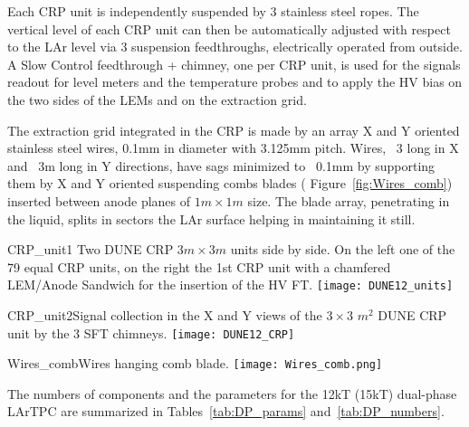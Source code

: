 Each CRP unit is independently suspended  by 3 stainless steel ropes. The  vertical level of each CRP unit can then be automatically adjusted with respect to the LAr level via 3 suspension feedthroughs, electrically operated from outside. A Slow Control feedthrough + chimney, one per CRP unit, is used for the signals readout for level meters and the temperature probes and to apply the HV bias on the two sides of the LEMs  and on the extraction grid.

The extraction grid integrated in the CRP  is made by an array X and Y oriented stainless steel wires, 0.1mm in diameter with 3.125mm pitch.  Wires, ~3 long in X and ~3m long in Y directions, have sags minimized to ~0.1mm by supporting them by X and Y oriented suspending combs blades ( Figure~\ref{fig:Wires_comb}) inserted between anode planes of $1m \times 1m$ size. The blade array, penetrating in the liquid, splits in sectors the LAr surface helping in maintaining it still.

\begin{cdrfigure}{CRP_unit1}{ Two DUNE CRP $3m\times 3m$ units side by side. On the left one of the 79 equal CRP units, on the right the 1st CRP unit with a chamfered LEM/Anode Sandwich for the insertion of the HV FT.}
\texttt{[image: DUNE12\_units]}
\end{cdrfigure}

\begin{cdrfigure}{CRP_unit2}{Signal collection in the X and Y views of the  $3\times3$ $m^2$ DUNE CRP unit by the 3 SFT chimneys.}
\texttt{[image: DUNE12\_CRP]}
\end{cdrfigure}

\begin{cdrfigure}{Wires_comb}{Wires hanging comb blade.}
\texttt{[image: Wires\_comb.png]}
\end{cdrfigure}

The numbers of components and the parameters for the 12kT (15kT) dual-phase  LArTPC are summarized in Tables~\ref{tab:DP_params} and~\ref{tab:DP_numbers}.

